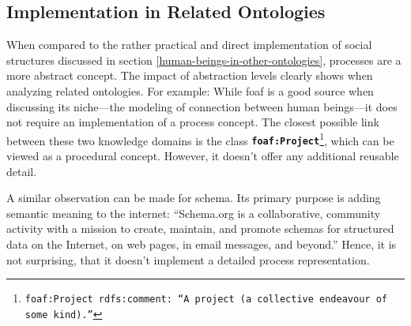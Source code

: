 \documentclass[a4paper, DIV=13, BCOR=0cm]{scrbook}
\newcommand{\class}[1]{\texttt{\textbf{#1}}}
\newcommand{\foottt}[1]{\footnote{\texttt{#1}}}
\begin{document}
\subsection{Implementation in Related Ontologies}
When compared to the rather practical and direct implementation of social structures discussed in section \ref{human-beings-in-other-ontologies}, processes are a more abstract concept. The impact of abstraction levels clearly shows when analyzing related ontologies. For example: While \gls{foaf} is a good source when discussing its niche---the modeling of connection between human beings---it does not require an implementation of a process concept. The closest possible link between these two knowledge domains is the  class \class{foaf:Project}\foottt{foaf:Project rdfs:comment: \enquote{A project (a collective endeavour of some kind).}}, which can be viewed as a procedural concept. However, it doesn't offer any additional reusable detail.

A similar observation can be made for \gls{schema}. Its primary purpose is adding semantic meaning to the internet: \enquote{Schema.org is a collaborative, community activity with a mission to create, maintain, and promote schemas for structured data on the Internet, on web pages, in email messages, and beyond.} \cite{schema-mission} Hence, it is not surprising, that it doesn't implement a detailed process representation.
\end{document}
